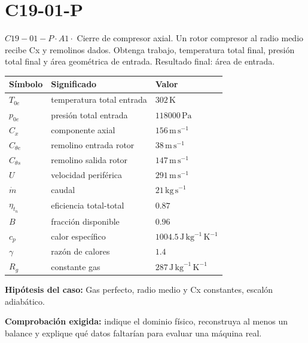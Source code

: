 \documentclass[10pt,openany]{book}
\begin{document}
\section{C19-01-P}
\(C19-01-P \cdot A1 \cdot\) Cierre de compresor axial. Un rotor compresor al radio medio recibe Cx y remolinos dados. Obtenga trabajo, temperatura total final, presión total final y área geométrica de entrada. Resultado final: área de entrada.
\begin{center}\begin{tabular}{p{.15\linewidth}p{.42\linewidth}p{.31\linewidth}}\textbf{Símbolo} & \textbf{Significado} & \textbf{Valor}\\\hline
\(T_{0e}\) & temperatura total entrada & \(302\,\mathrm{K}\)\\
\(p_{0e}\) & presión total entrada & \(118000\,\mathrm{Pa}\)\\
\(C_x\) & componente axial & \(156\,\mathrm{m}\,\mathrm{s}^{-1}\)\\
\(C_{\theta e}\) & remolino entrada rotor & \(38\,\mathrm{m}\,\mathrm{s}^{-1}\)\\
\(C_{\theta s}\) & remolino salida rotor & \(147\,\mathrm{m}\,\mathrm{s}^{-1}\)\\
\(U\) & velocidad periférica & \(291\,\mathrm{m}\,\mathrm{s}^{-1}\)\\
\(\dot m\) & caudal & \(21\,\mathrm{kg}\,\mathrm{s}^{-1}\)\\
\(\eta_{t_n}\) & eficiencia total-total & \(0.87\)\\
\(B\) & fracción disponible & \(0.96\)\\
\(c_p\) & calor específico & \(1004.5\,\mathrm{J}\,\mathrm{kg}^{-1}\,\mathrm{K}^{-1}\)\\
\(\gamma\) & razón de calores & \(1.4\)\\
\(R_g\) & constante gas & \(287\,\mathrm{J}\,\mathrm{kg}^{-1}\,\mathrm{K}^{-1}\)\\
\end{tabular}\end{center}
\noindent\textbf{Hipótesis del caso:} Gas perfecto, radio medio y Cx constantes, escalón adiabático.\par
\noindent\textbf{Comprobación exigida:} indique el dominio físico, reconstruya al menos un balance y explique qué datos faltarían para evaluar una máquina real.\par
\begin{center}\end{center}
\clearpage
\end{document}
